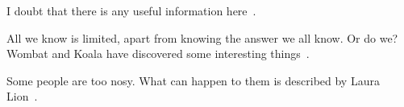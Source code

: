 \documentclass{article}
\begin{document}
I doubt that there is any useful information here~\cite{wikibook}.

All we know is limited, apart from knowing the answer we all know. Or do we? Wombat and Koala have discovered some interesting things~\cite{wombat2016}.

Some people are too nosy. What can happen to them is described by Laura Lion~\cite[9]{lion2010}.

\printbibliography
\end{document}
